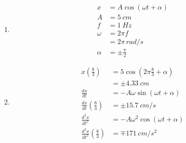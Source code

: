 \documentclass{article}
\begin{document}
\begin{enumerate}
  \item

        \begin{align*}
          x      & = A \cos (\omega t + \alpha) \\
          A      & = \qty{5}{cm}                \\
          f      & = \qty{1}{Hz}                \\
          \omega & = 2 \pi f                    \\
                 & = 2 \pi \,\unit{rad/s}       \\
          \alpha & = \pm \frac{\pi}{2}
        \end{align*}

  \item

        \begin{align*}
          x \left( \frac{8}{3} \right)                   & = 5 \cos \left( 2 \pi \frac{8}{3} + \alpha \right) \\
                                                         & = \pm \qty{4.33}{cm}                               \\
          \frac{d x}{d t}                                & = -A \omega \sin (\omega t + \alpha)               \\
          \frac{d x}{d t} \left( \frac{8}{3} \right)     & = \pm \qty{15.7}{cm/s}                             \\
          \frac{d^2 x}{d t^2}                            & = -A \omega^2 \cos (\omega t + \alpha)             \\
          \frac{d^2 x}{d t^2} \left( \frac{8}{3} \right) & = \mp \qty{171}{cm/s^2}
        \end{align*}
\end{enumerate}

\subsection{}
\end{document}
